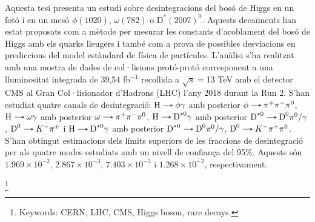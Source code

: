 Aquesta tesi presenta un estudi sobre desintegracions del bosó de Higgs en un fotó i en un mesó $\phi(1020)$, $\omega(782)$ o $\text{D}^{*}(2007)^{0}$. Aquests decaïments han estat proposats com a mètode per mesurar les constants d'acoblament del bosó de Higgs amb els quarks lleugers i també com a prova de possibles desviacions en prediccions del model estàndard de física de partícules. L'anàlisi s'ha realitzat amb una mostra de dades de col·lisions protó-protó corresponent a una lluminositat integrada de 39,54 fb$^{-1}$ recollida a $\sqrt{s}=$13 TeV amb el detector CMS al Gran Col·lisionador d'Hadrons (LHC) l'any 2018 durant la Run 2. S'han estudiat quatre canals de desintegració: $\text{H}\decaysto \phi\gamma$ amb posterior $\phi\decaysto \pi^+\pi^-\pi^0$, $\text{H}\decaysto \omega\gamma$ amb posterior $\omega\decaysto \pi^+\pi^-\pi^0$, $\text{H}\decaysto \text{D}^{*0}\gamma$ amb posterior $\text{D}^{*0}\decaysto \text{D}^{0}\pi^{0}/\gamma$, $\text{D}^{0}\decaysto K^{-}\pi^{+}$ i $\text{H}\decaysto \text{D}^{*0}\gamma$ amb posterior $\text{D}^{*0}\decaysto \text{D}^{0}\pi^{0}/\gamma$, $\text{D}^{0}\decaysto K^{-}\pi^{+}\pi^{0}$. S'han obtingut estimacions dels límits superiors de les fraccions de desintegració per als quatre modes estudiats amb un nivell de confiança del 95\%. Aquests són $1.969 \times 10^{-2}$, $2.867 \times 10^{-3}$, $7.403 \times 10^{-3}$ i $1.268 \times 10^{-2}$, respectivament.

\vspace*{-0.2cm}


{\let\thefootnote\relax\footnote{Keywords: CERN, LHC, CMS, Higgs boson, rare decays.}}
